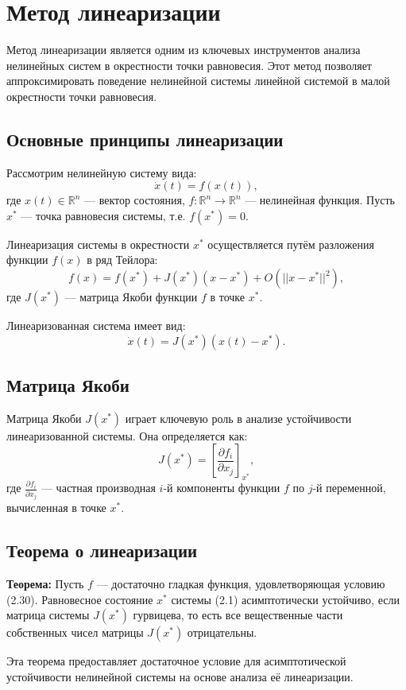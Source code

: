 \documentclass[a4paper,14pt]{extarticle} %
\begin{document}
\section{Метод линеаризации}

Метод линеаризации является одним из ключевых инструментов анализа нелинейных систем в окрестности точки равновесия. Этот метод позволяет аппроксимировать поведение нелинейной системы линейной системой в малой окрестности точки равновесия.

\subsection{Основные принципы линеаризации}

Рассмотрим нелинейную систему вида:
\[
\dot{x}(t) = f(x(t)),
\]
где \(x(t) \in \mathbb{R}^n\) — вектор состояния, \(f: \mathbb{R}^n \to \mathbb{R}^n\) — нелинейная функция. Пусть \(x^*\) — точка равновесия системы, т.е. \(f(x^*) = 0\).

Линеаризация системы в окрестности \(x^*\) осуществляется путём разложения функции \(f(x)\) в ряд Тейлора:
\[
f(x) = f(x^*) + J(x^*)(x - x^*) + O(||x - x^*||^2),
\]
где \(J(x^*)\) — матрица Якоби функции \(f\) в точке \(x^*\).

Линеаризованная система имеет вид:
\[
\dot{x}(t) = J(x^*)(x(t) - x^*).
\]

\subsection{Матрица Якоби}

Матрица Якоби \(J(x^*)\) играет ключевую роль в анализе устойчивости линеаризованной системы. Она определяется как:
\[
J(x^*) = \left[\frac{\partial f_i}{\partial x_j}\right]_{x^*},
\]
где \(\frac{\partial f_i}{\partial x_j}\) — частная производная \(i\)-й компоненты функции \(f\) по \(j\)-й переменной, вычисленная в точке \(x^*\).

\subsection{Теорема о линеаризации}

\textbf{Теорема:} Пусть \(f\) — достаточно гладкая функция, удовлетворяющая условию (2.30). Равновесное состояние \(x^*\) системы (2.1) асимптотически устойчиво, если матрица системы \(J(x^*)\) гурвицева, то есть все вещественные части собственных чисел матрицы \(J(x^*)\) отрицательны.

Эта теорема предоставляет достаточное условие для асимптотической устойчивости нелинейной системы на основе анализа её линеаризации.
\end{document}
